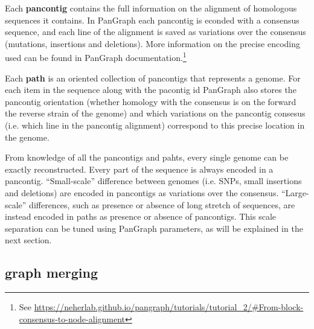 \documentclass[aps,rmp,reprint,superscriptaddress,notitlepage,10pt,onecolumn]{revtex4-1}
\begin{document}
Each \textbf{pancontig} contains the full information on the alignment of homologous sequences it contains. In PanGraph each pancontig is econded with a consensus sequence, and each line of the alignment is saved as variations over the consensus (mutations, insertions and deletions). More information on the precise encoding used can be found in PanGraph documentation.\footnote{See \url{https://neherlab.github.io/pangraph/tutorials/tutorial_2/\#From-block-consensus-to-node-alignment}}

Each \textbf{path} is an oriented collection of pancontigs that represents a genome. For each item in the sequence along with the pacontig id PanGraph also stores the pancontig orientation (whether homology with the consensus is on the forward the reverse strain of the genome) and which variations on the pancontig consesus (i.e. which line in the pancontig alignment) correspond to this precise location in the genome.

From knowledge of all the pancontigs and pahts, every single genome can be exactly reconstructed. Every part of the sequence is always encoded in a pancontig. ``Small-scale'' difference between genomes (i.e. SNPs, small insertions and deletions) are encoded in pancontigs as variations over the consensus. ``Large-scale'' differences, such as presence or absence of long stretch of sequences, are instead encoded in paths as presence or absence of pancontigs. This scale separation can be tuned using PanGraph parameters, as will be explained in the next section.

\subsection*{graph merging}
\end{document}
